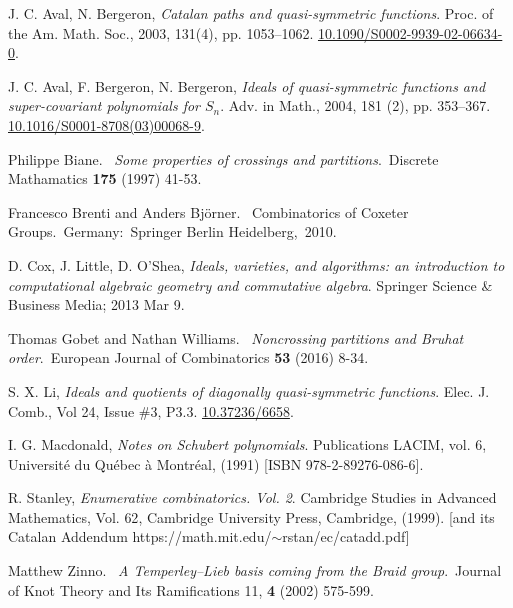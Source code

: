 \documentclass[12pt]{amsart}
\theoremstyle{definition}
\theoremstyle{remark}
\numberwithin{equation}{section}
\begin{document}
\begin{thebibliography}{99}




 J. C. Aval, N. Bergeron,
\textit{Catalan paths and quasi-symmetric functions}.
Proc. of the Am. Math. Soc., 2003, 131(4), pp. 1053--1062.
\href{https://doi.org/10.1090/S0002-9939-02-06634-0}{10.1090/S0002-9939-02-06634-0}.

 J. C. Aval, F. Bergeron, N. Bergeron,
\textit{Ideals of quasi-symmetric functions and super-covariant polynomials for $S_n$}.
Adv. in Math., 2004, 181 (2), pp. 353--367.
\href{https://doi.org/10.1016/S0001-8708(03)00068-9}{10.1016/S0001-8708(03)00068-9}.

  Philippe Biane.  \textit{Some properties of crossings and partitions}. Discrete Mathamatics {\bf 175} (1997) 41-53.

  Francesco Brenti and Anders Bj\"{o}rner.  Combinatorics of Coxeter Groups. Germany: Springer Berlin Heidelberg, 2010.


 D. Cox, J. Little, D. O'Shea,
\textit{Ideals, varieties, and algorithms: an introduction to computational
algebraic geometry and commutative algebra}.
Springer Science \& Business Media; 2013 Mar 9.

  Thomas Gobet and Nathan Williams.  \textit{Noncrossing partitions and Bruhat order}. European Journal of Combinatorics {\bf 53} (2016) 8-34.


 S. X. Li,
\textit{Ideals and quotients of diagonally quasi-symmetric functions}.
Elec. J. Comb., Vol 24, Issue \#3, P3.3.
\href{https://doi.org/10.37236/6658}{10.37236/6658}.

 I. G. Macdonald,
\textit{Notes on Schubert polynomials}.
Publications LACIM, vol. 6, Universit\'e du Qu\'ebec \`a Montr\'eal,  (1991) [ISBN 978-2-89276-086-6].



 R. Stanley,
\textit{Enumerative combinatorics. {V}ol. 2}.
{Cambridge Studies in Advanced Mathematics}, Vol. {62},
{Cambridge University Press, Cambridge}, (1999). [and its {Catalan Addendum} https://math.mit.edu/$\sim$rstan/ec/catadd.pdf]

  Matthew Zinno.  \textit{A Temperley--Lieb basis coming from the Braid group}. Journal of Knot Theory and Its Ramifications 11, {\bf 4} (2002) 575-599.



\end{thebibliography}
\end{document}
